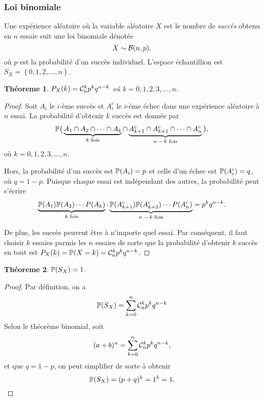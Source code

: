 \documentclass[11pt]{article}
\newcommand\comb[2]{%
	\ensuremath{%
		\mathcal{C}_{#2}^{#1}%
	}%
}%
\renewcommand\P{%
	\ensuremath{%
		\mathbb{P}%
	}%
}%
\newcommand\bin{%
	\ensuremath{%
		\mathcal{B}%
	}%
}%
\newtheorem{theoreme}{Théoreme}[section]
\begin{document}
\subsubsection{Loi binomiale}
Une expérience aléatoire où la variable aléatoire $X$ est le nombre de
\textit{succès} obtenu en $n$ essaie suit une loi binomiale dénotée
\begin{equation*}
	X\sim\bin(n,p),
\end{equation*}
où $p$ est la probabilité d'un succès individuel. L'espace échantillion est
$S_X=\left\{0,1,2,\dots,n\right\}$.

\begin{theoreme}
	$P_X(k)=\comb{k}{n}p^kq^{n-k}$ où $k=0,1,2,3,\dots,n$.
\end{theoreme}

\begin{proof}
	Soit $A_i$ le $i$-ème succès et $A_i^c$ le $i$-ème échec dans une
	expérience aléatoire à $n$ essai. La probabilité d'obtenir $k$ succès est
	donnée par
	\begin{equation*}
		\P\big(
			\underbrace{A_1\cap A_2\cap\cdots\cap A_k}_\text{$k$ fois}
			\cap
			\underbrace{A_{k+1}^c\cap A_{k+1}^c\cap\cdots\cap A_n^c}_
			\text{$n-k$ fois}
		\big),
	\end{equation*}
	où $k=0,1,2,3,\dots,n$.

	Hors, la probabilité d'un succès est $\P(A_i)=p$ et celle d'un échec est
	$\P(A_i^c)=q$, où $q=1-p$. Puisque chaque essai est indépendant des autres,
	la probabilité peut s'écrire
	\begin{equation*}
		\underbrace{
			\P(A_1)\P(A_2)\cdots P(A_k)
		}_\text{$k$ fois}
		\cdot
		\underbrace{
			\P(A_{k+1}^c)\P(A_{k+2}^c)\cdots P(A_n^c)
		}_\text{$n-k$ fois}
		=p^kq^{n-k}.
	\end{equation*}

	De plus, les succès peuvent être à n'importe quel essai. Par conséquent,
	il faut choisir $k$ essaies parmis les $n$ essaies de sorte que la
	probabilité d'obtenir $k$ succès en tout est
	$P_X(k)=\P(X=k)=\comb{k}{n}p^kq^{n-k}$.
\end{proof}

\begin{theoreme}
	$\P(S_X)=1$.
\end{theoreme}

\begin{proof}
	Par définition, on a
	\begin{equation*}
		\P(S_X)=\sum_{k=0}^n\comb{k}{n}p^kq^{n-k}
	\end{equation*}
	Selon le théorème binomial, soit
	\begin{equation*}
		(a+b)^n=\sum_{k=0}^n\comb{k}{n}p^kq^{n-k},
	\end{equation*}
	et que $q=1-p$, on peut simplifier de sorte à obtenir
	\begin{equation*}
		\P(S_X)=(p+q)^k=1^k=1.\qedhere
	\end{equation*}
\end{proof}
\end{document}
